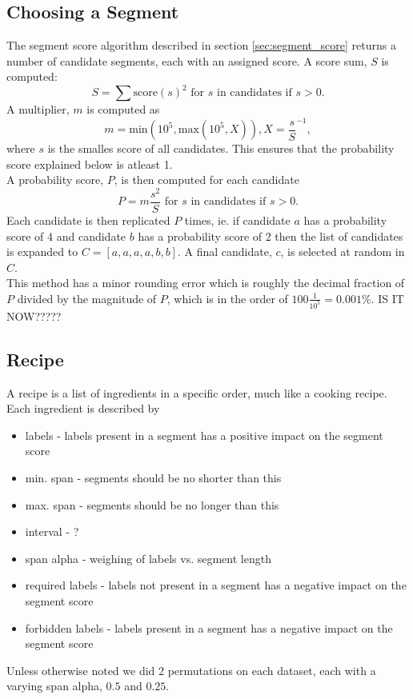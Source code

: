 \subsection{Choosing a Segment}
%
The segment score algorithm described in section \ref{sec:segment_score} returns a number of candidate segments, each with an assigned score. A score sum, $S$ is computed:
\[
S = \sum{\text{score}(s)^2 \text{ for } s \text{ in candidates if } s > 0}.
\]
A multiplier, $m$ is computed as
\[
m = \text{min}(10^5, \text{max}(10^5, X)), X = \frac{s}{S}^{-1},
\] %
where $s$ is the smalles score of all candidates. This ensures that the probability score explained below is atleast 1.\\
A probability score, $P$, is then computed for each candidate 
\[
P = m \frac{s^2}{S} \text{ for } s \text{ in candidates if } s > 0.
\] %
Each candidate is then replicated $P$ times, ie. if candidate $a$ has a probability score of 4 and candidate $b$ has a probability score of 2 then the list of candidates is expanded to $C = [a,a,a,a,b,b]$. A final candidate, $c$, is selected at random in $C$.\\
This method has a minor rounding error which is roughly the decimal fraction of $P$ divided by the magnitude of $P$, which is in the order of $100\frac{1}{10^5} = 0.001\%$. IS IT NOW?????
%
\subsection{Recipe}
%
A recipe is a list of ingredients in a specific order, much like a cooking recipe. Each ingredient is described by
\begin{itemize}
\item labels - labels present in a segment has a positive impact on the segment score
\item min. span - segments should be no shorter than this
\item max. span - segments should be no longer than this
\item interval - ?
\item span alpha - weighing of labels vs. segment length
\item required labels - labels not present in a segment has a negative impact on the segment score
\item forbidden labels - labels present in a segment has a negative impact on the segment score
\end{itemize}
Unless otherwise noted we did 2 permutations on each dataset, each with a varying span alpha, $0.5$ and $0.25$.
%
